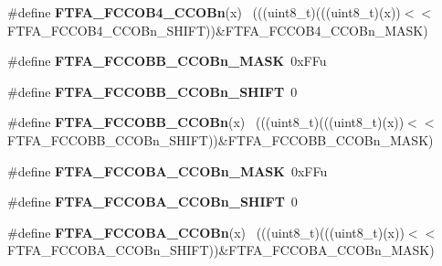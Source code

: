 \begin{DoxyCompactItemize}
\item 
\hypertarget{group___f_t_f_a___register___masks_ga7297ff00a0f9f70436256a42ad07d167}{}\#define {\bfseries F\+T\+F\+A\+\_\+\+F\+C\+C\+O\+B4\+\_\+\+C\+C\+O\+Bn}(x)                                      ~(((uint8\+\_\+t)(((uint8\+\_\+t)(x))$<$$<$F\+T\+F\+A\+\_\+\+F\+C\+C\+O\+B4\+\_\+\+C\+C\+O\+Bn\+\_\+\+S\+H\+I\+F\+T))\&F\+T\+F\+A\+\_\+\+F\+C\+C\+O\+B4\+\_\+\+C\+C\+O\+Bn\+\_\+\+M\+A\+S\+K)\label{group___f_t_f_a___register___masks_ga7297ff00a0f9f70436256a42ad07d167}

\item 
\hypertarget{group___f_t_f_a___register___masks_ga286640e4b2ec8195c749e88ef23d6e9b}{}\#define {\bfseries F\+T\+F\+A\+\_\+\+F\+C\+C\+O\+B\+B\+\_\+\+C\+C\+O\+Bn\+\_\+\+M\+A\+S\+K}~0x\+F\+Fu\label{group___f_t_f_a___register___masks_ga286640e4b2ec8195c749e88ef23d6e9b}

\item 
\hypertarget{group___f_t_f_a___register___masks_gab9fc4173503ca47be2b4a04ec4635905}{}\#define {\bfseries F\+T\+F\+A\+\_\+\+F\+C\+C\+O\+B\+B\+\_\+\+C\+C\+O\+Bn\+\_\+\+S\+H\+I\+F\+T}~0\label{group___f_t_f_a___register___masks_gab9fc4173503ca47be2b4a04ec4635905}

\item 
\hypertarget{group___f_t_f_a___register___masks_ga18496a4435fd2ef4b21ae7a852098035}{}\#define {\bfseries F\+T\+F\+A\+\_\+\+F\+C\+C\+O\+B\+B\+\_\+\+C\+C\+O\+Bn}(x)                                      ~(((uint8\+\_\+t)(((uint8\+\_\+t)(x))$<$$<$F\+T\+F\+A\+\_\+\+F\+C\+C\+O\+B\+B\+\_\+\+C\+C\+O\+Bn\+\_\+\+S\+H\+I\+F\+T))\&F\+T\+F\+A\+\_\+\+F\+C\+C\+O\+B\+B\+\_\+\+C\+C\+O\+Bn\+\_\+\+M\+A\+S\+K)\label{group___f_t_f_a___register___masks_ga18496a4435fd2ef4b21ae7a852098035}

\item 
\hypertarget{group___f_t_f_a___register___masks_gaa0a0a7f61d12d4ec0fd9ee2c9117cd03}{}\#define {\bfseries F\+T\+F\+A\+\_\+\+F\+C\+C\+O\+B\+A\+\_\+\+C\+C\+O\+Bn\+\_\+\+M\+A\+S\+K}~0x\+F\+Fu\label{group___f_t_f_a___register___masks_gaa0a0a7f61d12d4ec0fd9ee2c9117cd03}

\item 
\hypertarget{group___f_t_f_a___register___masks_ga7ed8fee49581acc92a76f451786a6723}{}\#define {\bfseries F\+T\+F\+A\+\_\+\+F\+C\+C\+O\+B\+A\+\_\+\+C\+C\+O\+Bn\+\_\+\+S\+H\+I\+F\+T}~0\label{group___f_t_f_a___register___masks_ga7ed8fee49581acc92a76f451786a6723}

\item 
\hypertarget{group___f_t_f_a___register___masks_ga78250ac15582a7c5125e3a7163f6e6a9}{}\#define {\bfseries F\+T\+F\+A\+\_\+\+F\+C\+C\+O\+B\+A\+\_\+\+C\+C\+O\+Bn}(x)                                      ~(((uint8\+\_\+t)(((uint8\+\_\+t)(x))$<$$<$F\+T\+F\+A\+\_\+\+F\+C\+C\+O\+B\+A\+\_\+\+C\+C\+O\+Bn\+\_\+\+S\+H\+I\+F\+T))\&F\+T\+F\+A\+\_\+\+F\+C\+C\+O\+B\+A\+\_\+\+C\+C\+O\+Bn\+\_\+\+M\+A\+S\+K)\label{group___f_t_f_a___register___masks_ga78250ac15582a7c5125e3a7163f6e6a9}


\end{DoxyCompactItemize}
